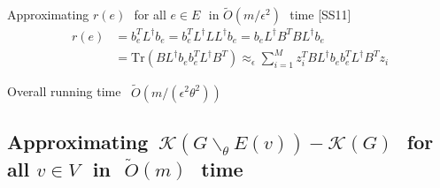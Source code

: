 \documentclass[12pt]{beamer}
\def\defeq{\stackrel{\mathrm{def}}{=}}
\def\eps{\epsilon}
\def\trace#1{\mathrm{Tr} \left(#1 \right)}
\newcommand\er{r}%
\newcommand\bb{\boldsymbol{\mathit{b}}}
\newcommand\zz{\boldsymbol{\mathit{z}}}
\newcommand\BB{\boldsymbol{\mathit{B}}}
\newcommand\LL{\boldsymbol{\mathit{L}}}
\newcommand{\kh}[1]{\left(#1\right)}
\newcommand{\bsk}{\backslash_\theta}
\begin{document}
\begin{spacing}{1.3}
{\begin{itemize}
{			\vspace{5pt}
			\item Approximating \scriptsize$\er(e)$\,\footnotesize\ for all \scriptsize$e \in E$\,\footnotesize\ in
				\scriptsize$\widetilde{O}(m/\eps^2)$\,\footnotesize\ time [SS11]
				\vspace{-5pt}
				\scriptsize
				\begin{align*}
					\er(e) &= \bb_e^T \LL^\dag \bb_e = \bb_e^T \LL^\dag \LL \LL^\dag \bb_e = \bb_e \LL^\dag \BB^T \BB \LL^\dag \bb_e
					\\ &= \trace{\BB\LL^\dag \bb_e \bb_e^T \LL^\dag \BB^T}
					\approx_{\eps} \sum\limits_{i=1}^{M} \zz_i^T \BB\LL^\dag \bb_e \bb_e^T \LL^\dag \BB^T \zz_i
				\end{align*}
				\footnotesize
				\vspace{-20pt}
			\item Overall running time \, \scriptsize$\widetilde{O}\kh{m/\kh{\eps^2\theta^2}}$\footnotesize
		}
	\end{itemize}
}
	
\subsection{Approximating\, \footnotesize$%
\mathcal{K}(G\bsk E(v)) - \mathcal{K}(G)$\,\small\   for
	all \footnotesize$v \in V$\,\small\   in\,\ 
	\footnotesize$\widetilde{O}(m)$\,\small\ time}
	


\end{spacing}
\end{document}
